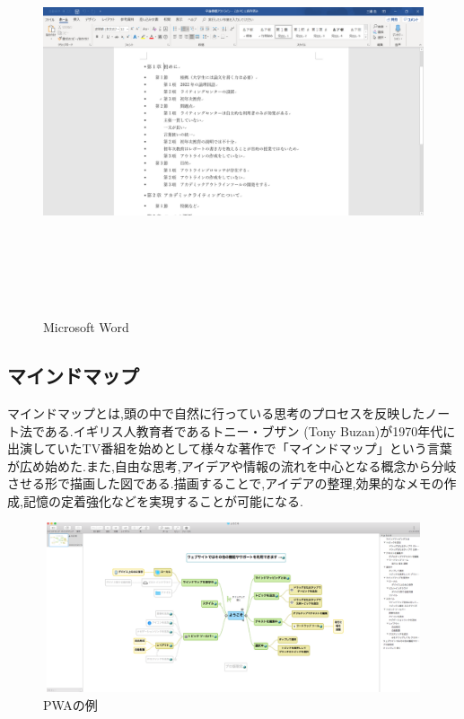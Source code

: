 \documentclass[a4j,12pt]{jarticle}
\begin{document}
\begin{figure}[H]
\begin{center}
 \includegraphics[clip,width=150mm,height=120mm]{word.png}
 \end{center}
 \caption{Microsoft Word}
 \label{fig:d}
\end{figure}

\newpage
\subsection{マインドマップ}
マインドマップとは,頭の中で自然に行っている思考のプロセスを反映したノート法である.イギリス人教育者であるトニー・ブザン (Tony Buzan)が1970年代に出演していたTV番組を始めとして様々な著作で「マインドマップ」という言葉が広め始めた\cite{ren4}.また,自由な思考,アイデアや情報の流れを中心となる概念から分岐させる形で描画した図である.描画することで,アイデアの整理,効果的なメモの作成,記憶の定着強化などを実現することが可能になる.
\begin{figure}[h]
\begin{center}
 \includegraphics[clip,width=150mm,height=50mm]{maindmap.png}
\end{center}
 \caption{PWAの例}
 \label{fig:e}
\end{figure}
\newpage
\end{document}
